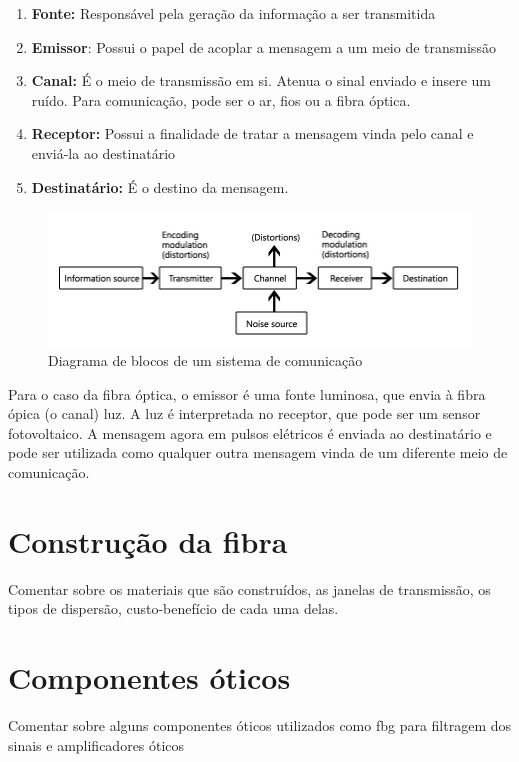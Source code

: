 \documentclass[article]{IEEEtran}
\begin{document}
\begin{enumerate}
\item \textbf{Fonte:} Responsável pela geração da informação a ser transmitida
\item \textbf{Emissor}: Possui o papel de acoplar a mensagem a um meio de transmissão
\item \textbf{Canal:} É o meio de transmissão em si. Atenua o sinal enviado e insere um ruído. Para comunicação, pode ser o ar, fios ou a fibra óptica.
\item \textbf{Receptor:} Possui a finalidade de tratar a mensagem vinda pelo canal e enviá-la ao destinatário
\item \textbf{Destinatário:} É o destino da mensagem.
\end{enumerate}

\begin{figure}[h]
\label{fig:diagrama-sistema-comunicacao}
\includegraphics[width=\columnwidth]{communication-system.jpg}
\caption{Diagrama de blocos de um sistema de comunicação}
\end{figure}

Para o caso da fibra óptica, o emissor é uma fonte luminosa, que envia à fibra ópica (o canal) luz. A luz é interpretada no receptor, que pode ser um sensor fotovoltaico. A mensagem agora em pulsos elétricos é enviada ao destinatário e pode ser utilizada como qualquer outra mensagem vinda de um diferente meio de comunicação.
\section{Construção da fibra}
Comentar sobre os materiais que são construídos, as janelas de transmissão, os tipos de dispersão, custo-benefício de cada uma delas.

\section{Componentes óticos}
Comentar sobre alguns componentes óticos utilizados como fbg para filtragem dos sinais e amplificadores óticos
\end{document}
